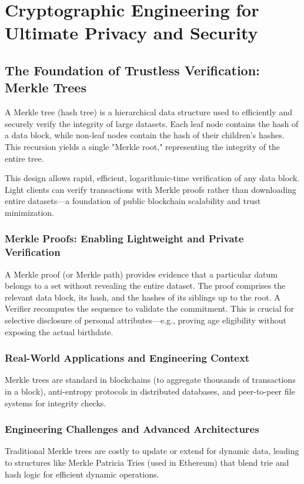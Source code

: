 \chapter{Cryptographic Engineering for Ultimate Privacy and Security}

\section{The Foundation of Trustless Verification: Merkle Trees}

A Merkle tree (hash tree) is a hierarchical data structure used to efficiently and securely verify the integrity of large datasets. Each leaf node contains the hash of a data block, while non-leaf nodes contain the hash of their children's hashes. This recursion yields a single "Merkle root," representing the integrity of the entire tree.

This design allows rapid, efficient, logarithmic-time verification of any data block. Light clients can verify transactions with Merkle proofs rather than downloading entire datasets—a foundation of public blockchain scalability and trust minimization.

\subsection{Merkle Proofs: Enabling Lightweight and Private Verification}
A Merkle proof (or Merkle path) provides evidence that a particular datum belongs to a set without revealing the entire dataset. The proof comprises the relevant data block, its hash, and the hashes of its siblings up to the root. A Verifier recomputes the sequence to validate the commitment. This is crucial for selective disclosure of personal attributes—e.g., proving age eligibility without exposing the actual birthdate.

\subsection{Real-World Applications and Engineering Context}
Merkle trees are standard in blockchains (to aggregate thousands of transactions in a block), anti-entropy protocols in distributed databases, and peer-to-peer file systems for integrity checks.

\subsection{Engineering Challenges and Advanced Architectures}
Traditional Merkle trees are costly to update or extend for dynamic data, leading to structures like Merkle Patricia Tries (used in Ethereum) that blend trie and hash logic for efficient dynamic operations.

